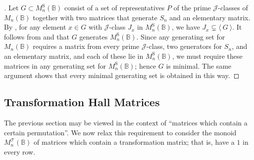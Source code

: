 \documentclass[11pt]{article}
\numberwithin{equation}{section}
\newcommand{\genset}[1]{\ensuremath{\langle\: #1 \:\rangle}}
\newcommand{\B}{\mathbb{B}}
\newcommand{\Bn}{M_n(\B)}
\newcommand{\Halln}{M_n^{\text{S}}(\B)}
\newcommand{\MTn}{M_n^{\mathcal{T}}(\B)}
\newcommand{\J}{\mathscr{J}}
\begin{document}
\begin{proof}[]
  Let $G \subset \Halln$ consist of a set of representatives $P$ of the prime
  $\J$-classes of $\Bn$ together with two matrices that generate $S_n$ and an
  elementary matrix. By , for any element $x \in G$ with
  $\J$-class $J_x$ in $\Halln$, we have $J_x \subsetneq \genset{G}$. It
  follows from  and 
  that $G$ generates $\Halln$. Since any generating set for $\Bn$ requires a
  matrix from every prime $\J$-class, two generators for $S_n$, and an
  elementary matrix, and each of these lie in $\Halln$, we must require these
  matrices in any generating set for $\Halln$; hence $G$ is minimal. The same
  argument shows that every minimal generating set is obtained in this way.
\end{proof}

\subsection{Transformation Hall Matrices}
\label{sec:TransBoolMat}
The previous section may be viewed in the context of ``matrices which contain a
certain permutation''. We now relax this requirement to consider the monoid
$\MTn$ of matrices which contain a transformation matrix; that is, have a $1$ in
every row.
\end{document}
